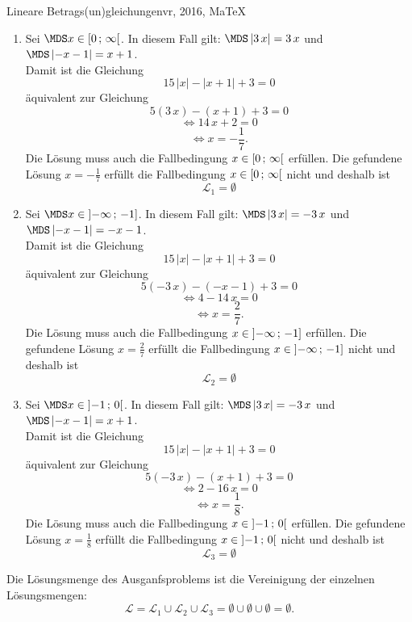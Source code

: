 \begin{MAufgabe}{Lineare Betrags(un)gleichungen}{vr, 2016, MaTeX}
 \begin{enumerate} 
 \item Sei $ \MDS x\in[ 0 \, \MIntvlSep \, \infty\MoIr $. 
 In diesem Fall gilt: 
  $ \MDS \left| 3\, x\right|=3\, x$ und $ \MDS \left|  - x - 1\right|=x + 1$. \\ 
 Damit ist die Gleichung 
 $$ 
15\, \left|x\right| - \left|x + 1\right| + 3= 0
$$
 \"aquivalent zur Gleichung
 $$ 
5\left(3\, x\right)-\left( x + 1\right)+3= 0 
$$  
$$ 
 \Leftrightarrow 14\, x + 2= 0 
$$  
$$ \Leftrightarrow x = - \frac{1}{7} . 
 $$ 
 Die L\"osung muss auch die Fallbedingung $x\in [ 0 \, ; \, \infty[\mbox{}  $ erf\"ullen. Die gefundene L\"osung $x=- \frac{1}{7}$ erf\"ullt die Fallbedingung  $x\in [ 0 \, ; \, \infty[\mbox{} $ nicht und deshalb ist  $$
 \mathcal{L}_{1}=\emptyset 
 $$ 
\item Sei $ \MDS x\in\MoIl  -\infty \, \MIntvlSep \, -1]$. 
 In diesem Fall gilt: 
  $ \MDS \left| 3\, x\right|=- 3\, x$ und $ \MDS \left|  - x - 1\right|= - x - 1$. \\ 
 Damit ist die Gleichung 
 $$ 
15\, \left|x\right| - \left|x + 1\right| + 3= 0
$$
 \"aquivalent zur Gleichung
 $$ 
5\left(- 3\, x\right)-\left(  - x - 1\right)+3= 0 
$$  
$$ 
 \Leftrightarrow 4 - 14\, x= 0 
$$  
$$ \Leftrightarrow x = \frac{2}{7} . 
 $$ 
 Die L\"osung muss auch die Fallbedingung $x\in \mbox{}]\mathopen{}  -\infty \, ; \, -1] $ erf\"ullen. Die gefundene L\"osung $x=\frac{2}{7}$ erf\"ullt die Fallbedingung  $x\in \mbox{}]\mathopen{}  -\infty \, ; \, -1]$ nicht und deshalb ist  $$
 \mathcal{L}_{2}=\emptyset 
 $$ 
\item Sei $ \MDS x\in\MoIl  -1 \, \MIntvlSep \, 0\MoIr $. 
 In diesem Fall gilt: 
  $ \MDS \left| 3\, x\right|=- 3\, x$ und $ \MDS \left|  - x - 1\right|=x + 1$. \\ 
 Damit ist die Gleichung 
 $$ 
15\, \left|x\right| - \left|x + 1\right| + 3= 0
$$
 \"aquivalent zur Gleichung
 $$ 
5\left(- 3\, x\right)-\left( x + 1\right)+3= 0 
$$  
$$ 
 \Leftrightarrow 2 - 16\, x= 0 
$$  
$$ \Leftrightarrow x = \frac{1}{8} . 
 $$ 
 Die L\"osung muss auch die Fallbedingung $x\in \mbox{}]\mathopen{}  -1 \, ; \, 0[\mbox{}  $ erf\"ullen. Die gefundene L\"osung $x=\frac{1}{8}$ erf\"ullt die Fallbedingung  $x\in \mbox{}]\mathopen{}  -1 \, ; \, 0[\mbox{} $ nicht und deshalb ist  $$
 \mathcal{L}_{3}=\emptyset 
 $$ 
 \end{enumerate} 
  Die L\"osungsmenge des Ausganfsproblems ist die Vereinigung der einzelnen L\"osungsmengen: 
$$ \mathcal{L} = \mathcal{L}_{1} \cup \mathcal{L}_{2} \cup \mathcal{L}_{3} 
 = \emptyset\cup \emptyset\cup \emptyset 
   =\emptyset 
   . $$ 
 

\end{MAufgabe}
